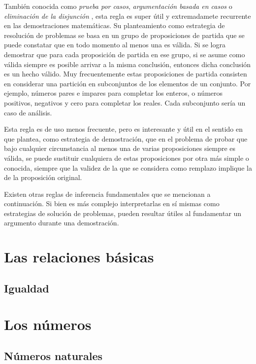 

También conocida como \textit{prueba por casos}, \textit{argumentación basada en casos} o \textit{eliminación de la disjunción} , esta regla es super útil y extremadamete recurrente en las demostraciones matemáticas. Su planteamiento como estrategia de resolución de problemas se basa en un grupo de proposiciones de partida que se puede constatar que en todo momento al menos una es válida. Si se logra demostrar que para cada proposición de partida en ese grupo, si se asume como válida siempre es posible arrivar a la misma conclusión, entonces dicha conclusión es un hecho válido. Muy frecuentemente estas proposiciones de partida consisten en considerar una partición en subconjuntos de los elementos de un conjunto. Por ejemplo, números pares e impares para completar los enteros, o números positivos, negativos y cero para completar los reales. Cada subconjunto sería un caso de análisis.



Esta regla es de uso menos frecuente, pero es interesante y útil en el sentido en que plantea, como estrategia de demostración, que en el problema de probar que bajo cualquier circunstancia al menos una de varias proposiciones siempre es válida, se puede sustituir cualquiera de estas proposiciones por otra más simple o conocida, siempre que la validez de la que se considera como remplazo implique la de la proposición original.

Existen otras reglas de inferencia fundamentales que se mencionan a continuación. Si bien es más complejo interpretarlas en sí mismas como estrategias de solución de problemas, pueden resultar útiles al fundamentar un argumento durante una demostración.











\section{Las relaciones básicas}
\subsection{Igualdad}




\section{Los números}
\subsection{Números naturales}



